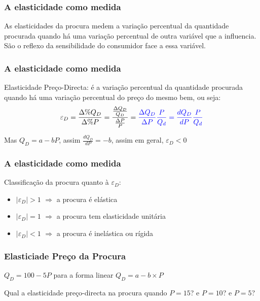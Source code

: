 \begin{frame}
	\frametitle{A elasticidade como medida}
	As elasticidades da procura medem a varia\c c\~ao percentual da quantidade procurada quando h\'a uma varia\c c\~ao percentual de outra vari\'avel que a influencia. S\~ao o reflexo da sensibilidade do consumidor face a essa vari\'avel.
\end{frame}

\begin{frame}
	\frametitle{A elasticidade como medida}

		Elasticidade Pre\c co-Directa: \'e a varia\c c\~ao percentual da quantidade procurada quando h\'a uma varia\c c\~ao percentual do pre\c co do mesmo bem, ou seja: \[\varepsilon_D=\frac{\Delta\%Q_D}{\Delta\%P}=\frac{\frac{\Delta Q_D}{Q_D}}{\frac{\Delta P}{P}}={\color{blue}\frac{\Delta Q_D}{\Delta P}\frac{P}{Q_d}=\frac{dQ_D}{dP}\frac{P}{Q_d}}\]

		Mas $Q_D=a-bP$, assim $\frac{dQ_D}{dP}=-b$, assim em geral, $\varepsilon_D<0$

\end{frame}

\begin{frame}
	\frametitle{A elasticidade como medida}
	Classifica\c c\~ao da procura quanto \`a $\varepsilon_D$:
	\begin{itemize}
		\setlength\itemsep{0.5cm}
		\item $|\varepsilon_D|>1$ $\Rightarrow$ a procura \'e el\'astica
		\item $|\varepsilon_D|=1$ $\Rightarrow$ a procura tem elasticidade unit\'aria
		\item $|\varepsilon_D|<1$ $\Rightarrow$ a procura \'e inel\'astica ou r\'igida
	\end{itemize}

\end{frame}

\begin{frame}
	\frametitle{Elasticiade Pre\c co da Procura}

	$Q_D=100-5P$ para a forma linear $Q_D=a-b\times P$

	\begin{center}
		\par
		Qual a elasticidade pre\c co-directa na procura quando $P=15$? e $P=10$? e $P=5$?
	\end{center}

\end{frame}

